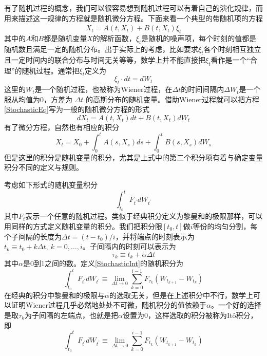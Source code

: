 有了随机过程的概念，我们可以很容易想到随机过程可以有着自己的演化规律，而用来描述这一规律的方程就是随机微分方程。下面来看一个典型的带随机项的方程
\begin{equation}
\dot{X_t}=A(t,X_t)+B(t,X_t)\xi_t
\label{StochasticEq}
\end{equation}
其中的$A$和$B$都是随机变量$X$的解析函数，$\xi_t$是随机的噪声项，每个时刻的值都是随机数且满足一定的随机分布。出于实际上的考虑，比如要求$\xi_t$各个时刻相互独立且一定时间内的联合分布与时间无关等等，数学上并不能直接把$\xi_t$看作是一个“合理”的随机过程。通常把$\xi_t$定义为
\begin{equation}
\xi_t \cdot dt=d W_t
\end{equation}
这里的$W_t$是一个随机过程，也被称为Wiener过程，在$\Delta t$的时间间隔内$\Delta W_t$是一个服从均值为0，方差为 $\Delta t$ 的高斯分布的随机变量。借助Wiener过程就可以把方程\eqref{StochasticEq}写为一般的随机微分方程的形式
\begin{equation}
d X_t=A(t,X_t) dt + B(t,X_t) d W_t
\label{StochasticDiff}
\end{equation}
有了微分方程，自然也有相应的积分
\begin{equation}
X_t=X_0 + \int_{0}^{t} A(s,X_s) ds + \int_{0}^{t} B(s,X_s) d W_s
\end{equation}
但是这里的积分是随机变量的积分，尤其是上式中的第二个积分项有着与确定变量积分不同的定义与规则。

考虑如下形式的随机变量积分
\begin{equation}
\int_{t_{0}}^{t} F_{t^{\prime}} d W_{t^{\prime}}
\label{StochasticInt}
\end{equation}
其中$F_{t}$表示一个任意的随机过程。类似于经典积分定义为黎曼和的极限那样，可以用同样的方式定义随机变量的积分。我们把积分限$[t_0,t]$做$i$等份的均匀分割，每个子间隔的长度为$\Delta t=\left(t-t_{0}\right) / i$，并将端点的时刻表示为$t_{k} \equiv t_{0}+k \Delta t,~ k=0, \ldots, i$。子间隔内的时刻可以表示为
\begin{equation}
\tau_{k} \equiv t_{k}+\alpha \Delta t
\end{equation}
其中$\alpha$是0到1之间的数。定义\eqref{StochasticInt}的随机积分为
\begin{equation}
\int_{t_{0}}^{t} F_{t^{\prime}} d W_{t^{\prime}} \equiv \lim\limits_{\Delta t \to 0} \sum_{k=0}^{i-1} F_{\tau_{k}}\left(W_{t_{k+1}}-W_{t_{k}}\right)
\end{equation}
在经典的积分中黎曼和的极限与$\alpha$的选取无关，但是在上述积分中不行，数学上可以证明Wiener过程几乎必然地处处不可微，随机积分的值依赖于$\alpha$。一个好的选择是取$\tau_{k}$为子间隔的左端点，也就是把$\alpha$设置为0，这样选取的积分被称为It\^o积分，即
\begin{equation}
\int_{t_{0}}^{t} F_{t^{\prime}} d W_{t^{\prime}} \equiv \lim\limits_{\Delta t \to 0} \sum_{k=0}^{i-1} F_{t_{k}}\left(W_{t_{k+1}}-W_{t_{k}}\right)
\label{ItoIntegral}
\end{equation}

